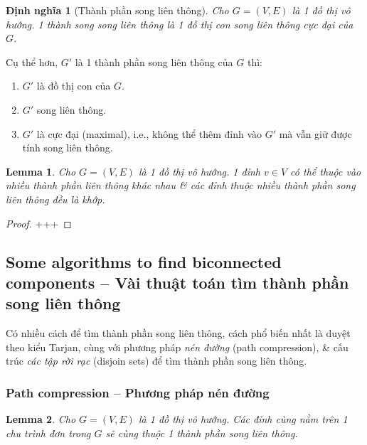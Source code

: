 \documentclass{article}
\newtheorem{dinhnghia}{Định nghĩa}
\newtheorem{lemma}{Lemma}
\begin{document}
\begin{dinhnghia}[Thành phần song liên thông]
    Cho $G = (V,E)$ là 1 đồ thị vô hướng. 1 {\rm thành song song liên thông} là 1 đồ thị con song liên thông cực đại của $G$.
\end{dinhnghia}
Cụ thể hơn, $G'$ là 1 thành phần song liên thông của $G$ thì:
\begin{enumerate}
    \item $G'$ là đồ thị con của $G$.
    \item $G'$ song liên thông.
    \item $G'$ là cực đại (maximal), i.e., không thể thêm đỉnh vào $G'$ mà vẫn giữ được tính song liên thông.
\end{enumerate}

\begin{lemma}
    Cho $G = (V,E)$ là 1 đồ thị vô hướng. 1 đỉnh $v\in V$ có thể thuộc vào nhiều thành phần liên thông khác nhau \& các đỉnh thuộc nhiều thành phần song liên thông đều là khớp.
\end{lemma}

\begin{proof}
    +++
\end{proof}


\subsection{Some algorithms to find biconnected components -- Vài thuật toán tìm thành phần song liên thông}
Có nhiều cách để tìm thành phần song liên thông, cách phổ biến nhất là duyệt theo kiểu Tarjan, cùng với phương pháp {\it nén đường} (path compression), \& cấu trúc {\it các tập rời rạc} (disjoin sets) để tìm thành phần song liên thông.


\subsubsection{Path compression -- Phương pháp nén đường}

\begin{lemma}
    Cho $G = (V,E)$ là 1 đồ thị vô hướng. Các đỉnh cùng nằm trên 1 chu trình đơn trong $G$ sẽ cùng thuộc 1 thành phần song liên thông.
\end{lemma}
\end{document}
